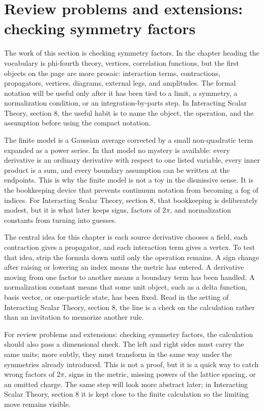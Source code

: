 \section{Review problems and extensions: checking symmetry factors}

The work of this section is checking symmetry factors.  In the chapter heading the vocabulary is phi-fourth theory, vertices, correlation functions, but the first objects on the page are more prosaic: interaction terms, contractions, propagators, vertices, diagrams, external legs, and amplitudes.  The formal notation will be useful only after it has been tied to a limit, a symmetry, a normalization condition, or an integration-by-parts step.  In Interacting Scalar Theory, section 8, the useful habit is to name the object, the operation, and the assumption before using the compact notation.

The finite model is a Gaussian average corrected by a small non-quadratic term expanded as a power series.  In that model no mystery is available: every derivative is an ordinary derivative with respect to one listed variable, every inner product is a sum, and every boundary assumption can be written at the endpoints.  This is why the finite model is not a toy in the dismissive sense.  It is the bookkeeping device that prevents continuum notation from becoming a fog of indices.  For Interacting Scalar Theory, section 8, that bookkeeping is deliberately modest, but it is what later keeps signs, factors of \(2\pi\), and normalization constants from turning into guesses.

The central idea for this chapter is each source derivative chooses a field, each contraction gives a propagator, and each interaction term gives a vertex.  To test that idea, strip the formula down until only the operation remains.  A sign change after raising or lowering an index means the metric has entered.  A derivative moving from one factor to another means a boundary term has been handled.  A normalization constant means that some unit object, such as a delta function, basis vector, or one-particle state, has been fixed.  Read in the setting of Interacting Scalar Theory, section 8, the line is a check on the calculation rather than an invitation to memorize another rule.

For review problems and extensions: checking symmetry factors, the calculation should also pass a dimensional check.  The left and right sides must carry the same units; more subtly, they must transform in the same way under the symmetries already introduced.  This is not a proof, but it is a quick way to catch wrong factors of \(2\pi\), signs in the metric, missing powers of the lattice spacing, or an omitted charge.  The same step will look more abstract later; in Interacting Scalar Theory, section 8 it is kept close to the finite calculation so the limiting move remains visible.

